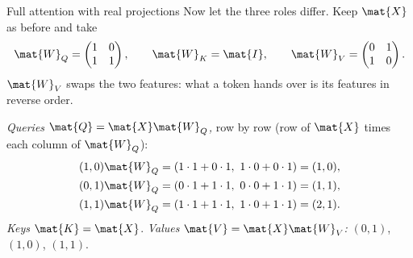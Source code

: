 
\begin{worked}[label={we:attention:proj}]{Full attention with real projections}
Now let the three roles differ. Keep $\mat{X}$ as before and take
\[
  \mat{W}_Q = \begin{pmatrix}1 & 0\\ 1 & 1\end{pmatrix},\qquad
  \mat{W}_K = \mat{I},\qquad
  \mat{W}_V = \begin{pmatrix}0 & 1\\ 1 & 0\end{pmatrix}.
\]
$\mat{W}_V$ swaps the two features: what a token hands over is its features in reverse order.

\emph{Queries $\mat{Q} = \mat{X}\mat{W}_Q$,} row by row (row of $\mat{X}$ times each column of
$\mat{W}_Q$):
\begin{align*}
  (1,0)\mat{W}_Q &= (1\cdot1 + 0\cdot1,\ 1\cdot0 + 0\cdot1) = (1, 0),\\
  (0,1)\mat{W}_Q &= (0\cdot1 + 1\cdot1,\ 0\cdot0 + 1\cdot1) = (1, 1),\\
  (1,1)\mat{W}_Q &= (1\cdot1 + 1\cdot1,\ 1\cdot0 + 1\cdot1) = (2, 1).
\end{align*}
\emph{Keys} $\mat{K} = \mat{X}$. \emph{Values $\mat{V} = \mat{X}\mat{W}_V$:} $(0,1)$, $(1,0)$,
$(1,1)$.


\end{worked}
